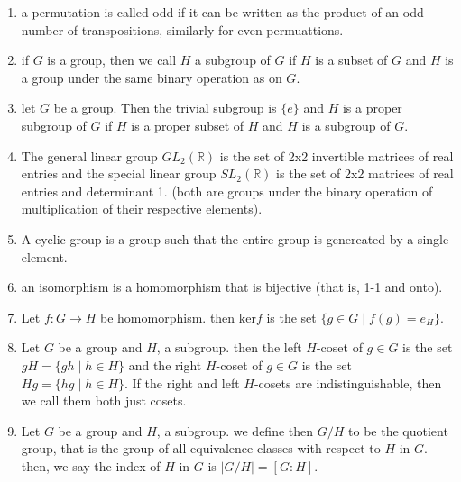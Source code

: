 \begin{enumerate}
	\item a permutation is called odd if it can be written as the product of an odd number of transpositions, similarly for even permuattions. 
	\item if $G$ is a group, then we call $H$ a subgroup of $G$ if $H$ is a subset of $G$ and $H$ is a group under the same binary operation as on $G$. 
	\item let $G$ be a group. Then the trivial subgroup is $\{e\}$ and $H$ is a proper subgroup of $G$ if $H$ is a proper subset of $H$ and $H$ is a subgroup of $G$. 
	\item The general linear group $GL_2(\mathbb{R})$ is the set of 2x2 invertible matrices of real entries and the special linear group $SL_2(\mathbb{R})$ is the set of 2x2 matrices of real entries and determinant 1. (both are groups under the binary operation of multiplication of their respective elements). 
	\item A cyclic group is a group such that the entire group is genereated by a single element. 
	\item an isomorphism is a homomorphism that is bijective (that is, 1-1 and onto). 
	\item Let $f: G \to H$ be homomorphism. then $\textrm{ker} f$ is the set $\{g \in G \mid f(g)=e_H\}$. 
	\item Let $G$ be a group and $H$, a subgroup. then the left $H$-coset of $g \in G$ is the set $gH = \{gh \mid h \in H\}$ and the right $H$-coset of $g \in G$ is the set $Hg = \{hg \mid h \in H\}$. If the right and left $H$-cosets are indistinguishable, then we call them both just cosets. 
	\item Let $G$ be a group and $H$, a subgroup. we define then $G/H$ to be the quotient group, that is the group of all equivalence classes with respect to $H$ in $G$. then, we say the index of $H$ in $G$ is $|G/H| = [G:H]$. 
\end{enumerate}

